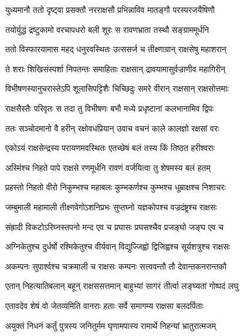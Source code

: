 
\twolineshloka
{युध्यमानौ ततो दृष्ट्वा प्रसक्तौ नरराक्षसौ}
{प्रभिन्नाविव मातङ्गौ परस्परजयैषिणौ} %

\twolineshloka
{तयोर्युद्धं द्रष्टुकामो वरचापधरो बली}
{शूरः स रावणभ्राता तस्थौ सङ्ग्राममूर्धनि} %

\twolineshloka
{ततो विस्फारयामास महद् धनुरवस्थितः}
{उत्ससर्ज च तीक्ष्णाग्रान् राक्षसेषु महाशरान्} %

\twolineshloka
{ते शराः शिखिसंस्पर्शा निपतन्तः समाहिताः}
{राक्षसान् द्रावयामासुर्वज्राणीव महागिरीन्} %

\twolineshloka
{विभीषणस्यानुचरास्तेऽपि शूलासिपट्टिशैः}
{चिच्छिदुः समरे वीरान् राक्षसान् राक्षसोत्तमाः} %

\twolineshloka
{राक्षसैस्तैः परिवृतः स तदा तु विभीषणः}
{बभौ मध्ये प्रधृष्टानां कलभानामिव द्विपः} %

\twolineshloka
{ततः सञ्चोदमानो वै हरीन् रक्षोवधप्रियान्}
{उवाच वचनं काले कालज्ञो रक्षसां वरः} %

\twolineshloka
{एकोऽयं राक्षसेन्द्रस्य परायणमवस्थितः}
{एतच्छेषं बलं तस्य किं तिष्ठत हरीश्वराः} %

\twolineshloka
{अस्मिंश्च निहते पापे राक्षसे रणमूर्धनि}
{रावणं वर्जयित्वा तु शेषमस्य बलं हतम्} %

\twolineshloka
{प्रहस्तो निहतो वीरो निकुम्भश्च महाबलः}
{कुम्भकर्णश्च कुम्भश्च धूम्राक्षश्च निशाचरः} %

\twolineshloka
{जम्बुमाली महामाली तीक्ष्णवेगोऽशनिप्रभः}
{सुप्तघ्नो यज्ञकोपश्च वज्रदंष्ट्रश्च राक्षसः} %

\twolineshloka
{संह्रादी विकटोऽरिघ्नस्तपनो मन्द एव च}
{प्रघासः प्रघसश्चैव प्रजङ्घो जङ्घ एव च} %

\twolineshloka
{अग्निकेतुश्च दुर्धर्षो रश्मिकेतुश्च वीर्यवान्}
{विद्युज्जिह्वो द्विजिह्वश्च सूर्यशत्रुश्च राक्षसः} %

\twolineshloka
{अकम्पनः सुपार्श्वश्च चक्रमाली च राक्षसः}
{कम्पनः सत्त्ववन्तौ तौ देवान्तकनरान्तकौ} %

\twolineshloka
{एतान् निहत्यातिबलान् बहून् राक्षससत्तमान्}
{बाहुभ्यां सागरं तीर्त्वा लङ्घ्यतां गोष्पदं लघु} %

\twolineshloka
{एतावदेव शेषं वो जेतव्यमिति वानराः}
{हताः सर्वे समागम्य राक्षसा बलदर्पिताः} %

\twolineshloka
{अयुक्तं निधनं कर्तुं पुत्रस्य जनितुर्मम}
{घृणामपास्य रामार्थे निहन्यां भ्रातुरात्मजम्} %

